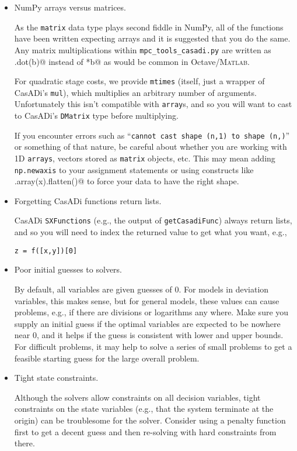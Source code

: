 \documentclass{article}
\newcommand{\casadi}{CasADi}
\begin{document}
\begin{itemize}
    \item NumPy arrays versus matrices.
    
    As the \texttt{matrix} data type plays second fiddle in NumPy, all of the functions have been written expecting arrays and it is suggested that you do the same.
    Any matrix multiplications within \texttt{mpc\_tools\_casadi.py} are written as \lstinline@A.dot(b)@ instead of \lstinline@A*b@ as would be common in Octave/\textsc{Matlab}.
    
    For quadratic stage costs, we provide \texttt{mtimes} (itself, just a wrapper of \casadi{}'s \texttt{mul}), which multiplies an arbitrary number of arguments.
    Unfortunately this isn't compatible with \texttt{array}s, and so you will want to cast to \casadi{}'s \texttt{DMatrix} type before multiplying.
    
    If you encounter errors such as ``\texttt{cannot cast shape (n,1) to shape (n,)}'' or something of that nature, be careful about whether you are working with 1D \texttt{arrays}, vectors stored as \texttt{matrix} objects, etc.
    This may mean adding \texttt{np.newaxis} to your assignment statements or using constructs like \lstinline@np.array(x).flatten()@ to force your data to have the right shape.
    
    \item Forgetting \casadi{} functions return lists.
    
    \casadi{} \texttt{SXFunctions} (e.g., the output of \texttt{getCasadiFunc}) always return lists, and so you will need to index the returned value to get what you want, e.g.,
\begin{lstlisting}[frame=L]
z = f([x,y])[0]
\end{lstlisting}
    
    \item Poor initial guesses to solvers.
    
    By default, all variables are given guesses of 0.
    For models in deviation variables, this makes sense, but for general models, these values can cause problems, e.g., if there are divisions or logarithms any where.
    Make sure you supply an initial guess if the optimal variables are expected to be nowhere near 0, and it helps if the guess is consistent with lower and upper bounds.
    For difficult problems, it may help to solve a series of small problems to get a feasible starting guess for the large overall problem.
    
    \item Tight state constraints.
    
    Although the solvers allow constraints on all decision variables, tight constraints on the state variables (e.g., that the system terminate at the origin) can be troublesome for the solver.
    Consider using a penalty function first to get a decent guess and then re-solving with hard constraints from there.
    
\end{itemize}
\end{document}
